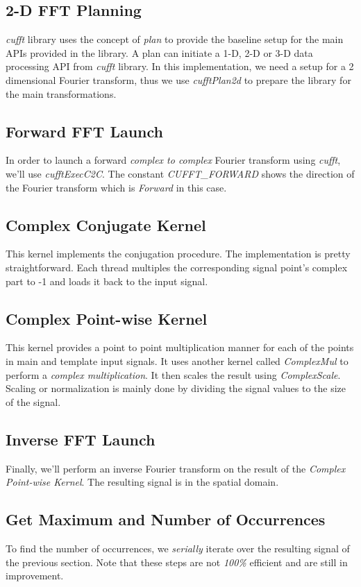 \subsection{2-D FFT Planning}
\textit{cufft} library uses the concept of \textit{plan} to provide the baseline setup for the main APIs provided in the library. A plan can initiate a 1-D, 2-D or 3-D data processing API from \textit{cufft} library. In this implementation, we need a setup for a 2 dimensional Fourier transform, thus we use \textit{cufftPlan2d} to prepare the library for the main transformations.

\subsection{Forward FFT Launch}
In order to launch a forward \textit{complex to complex} Fourier transform using \textit{cufft}, we'll use \textit{cufftExecC2C}. The constant \textit{CUFFT\_FORWARD} shows the direction of the Fourier transform which is \textit{Forward} in this case.

\subsection{Complex Conjugate Kernel}
This kernel implements the conjugation procedure. The implementation is pretty straightforward. Each thread multiples the corresponding signal point's complex part to -1 and loads it back to the input signal.

\subsection{Complex Point-wise Kernel}
This kernel provides a point to point multiplication manner for each of the points in main and template input signals. It uses another kernel called \textit{ComplexMul} to perform a \textit{complex multiplication}. It then scales the result using \textit{ComplexScale}. Scaling or normalization is mainly done by dividing the signal values to the size of the signal.

\subsection{Inverse FFT Launch}
Finally, we'll perform an inverse Fourier transform on the result of the \textit{Complex Point-wise Kernel}. The resulting signal is in the spatial domain.

\subsection{Get Maximum and Number of Occurrences}
To find the number of occurrences, we \textit{serially} iterate over the resulting signal of the previous section. Note that these steps are not \textit{100\%} efficient and are still in improvement.